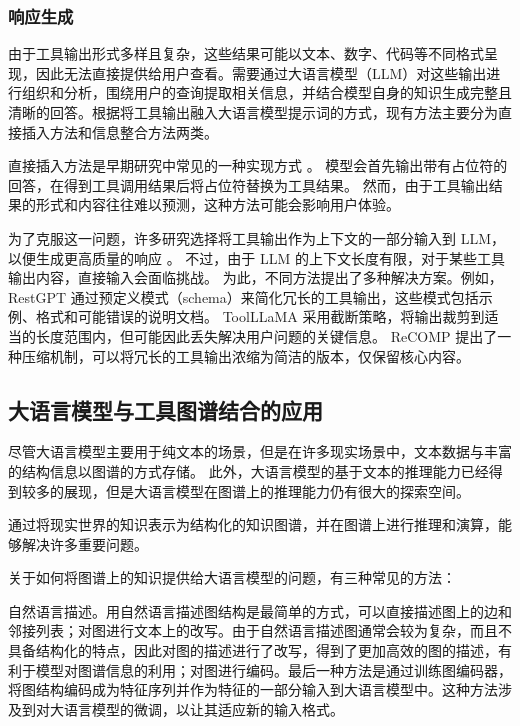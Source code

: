 \subsubsection{响应生成}

由于工具输出形式多样且复杂，这些结果可能以文本、数字、代码等不同格式呈现，因此无法直接提供给用户查看。需要通过大语言模型（LLM）对这些输出进行组织和分析，围绕用户的查询提取相关信息，并结合模型自身的知识生成完整且清晰的回答。根据将工具输出融入大语言模型提示词的方式，现有方法主要分为直接插入方法和信息整合方法两类。

直接插入方法是早期研究中常见的一种实现方式 \cite{schick2024toolformer, wang2024tools, hao2024toolkengpt}。
模型会首先输出带有占位符的回答，在得到工具调用结果后将占位符替换为工具结果。
然而，由于工具输出结果的形式和内容往往难以预测，这种方法可能会影响用户体验。

为了克服这一问题，许多研究选择将工具输出作为上下文的一部分输入到 LLM，以便生成更高质量的响应 \cite{shen2024hugginggpt,}。
不过，由于 LLM 的上下文长度有限，对于某些工具输出内容，直接输入会面临挑战。
为此，不同方法提出了多种解决方案。例如，RestGPT \cite{Song2023} 通过预定义模式（schema）来简化冗长的工具输出，这些模式包括示例、格式和可能错误的说明文档。
ToolLLaMA \cite{Qin2023} 采用截断策略，将输出裁剪到适当的长度范围内，但可能因此丢失解决用户问题的关键信息。
ReCOMP \cite{xu2023recomp} 提出了一种压缩机制，可以将冗长的工具输出浓缩为简洁的版本，仅保留核心内容。

\subsection{大语言模型与工具图谱结合的应用}

尽管大语言模型主要用于纯文本的场景，但是在许多现实场景中，文本数据与丰富的结构信息以图谱的方式存储。
此外，大语言模型的基于文本的推理能力已经得到较多的展现，但是大语言模型在图谱上的推理能力仍有很大的探索空间。

通过将现实世界的知识表示为结构化的知识图谱，并在图谱上进行推理和演算，能够解决许多重要问题。

关于如何将图谱上的知识提供给大语言模型的问题，有三种常见的方法：

自然语言描述。用自然语言描述图结构是最简单的方式，可以直接描述图上的边和邻接列表；对图进行文本上的改写。由于自然语言描述图通常会较为复杂，而且不具备结构化的特点，因此对图的描述进行了改写，得到了更加高效的图的描述，有利于模型对图谱信息的利用；对图进行编码。最后一种方法是通过训练图编码器，将图结构编码成为特征序列并作为特征的一部分输入到大语言模型中。这种方法涉及到对大语言模型的微调，以让其适应新的输入格式。


